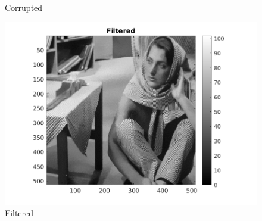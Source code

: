 \documentclass[12pt, a4paper]{article}
\begin{document}
\begin{figure}[h]
\begin{minipage}[c][1\width]{0.3\textwidth}
    	\caption{Corrupted}
	    \label{fig:3.2(b)}
    \end{minipage}
    \renewcommand{\thefigure}{3.2(c)}
    \begin{minipage}[c][1\width]{0.3\textwidth}
    	\includegraphics[width=1.5\textwidth]{barbara_filtered.png}
    	\caption{Filtered}
	    \label{fig:3.2(c)}
    \end{minipage}
\end{figure}
\newpage
\end{document}
